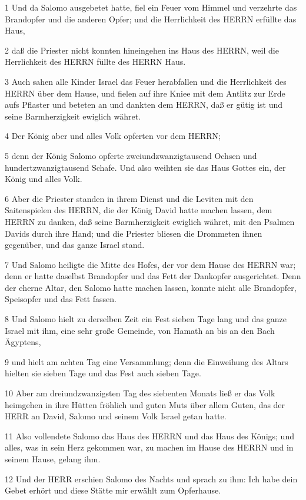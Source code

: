 \par 1 Und da Salomo ausgebetet hatte, fiel ein Feuer vom Himmel und verzehrte das Brandopfer und die anderen Opfer; und die Herrlichkeit des HERRN erfüllte das Haus,
\par 2 daß die Priester nicht konnten hineingehen ins Haus des HERRN, weil die Herrlichkeit des HERRN füllte des HERRN Haus.
\par 3 Auch sahen alle Kinder Israel das Feuer herabfallen und die Herrlichkeit des HERRN über dem Hause, und fielen auf ihre Kniee mit dem Antlitz zur Erde aufs Pflaster und beteten an und dankten dem HERRN, daß er gütig ist und seine Barmherzigkeit ewiglich währet.
\par 4 Der König aber und alles Volk opferten vor dem HERRN;
\par 5 denn der König Salomo opferte zweiundzwanzigtausend Ochsen und hundertzwanzigtausend Schafe. Und also weihten sie das Haus Gottes ein, der König und alles Volk.
\par 6 Aber die Priester standen in ihrem Dienst und die Leviten mit den Saitenspielen des HERRN, die der König David hatte machen lassen, dem HERRN zu danken, daß seine Barmherzigkeit ewiglich währet, mit den Psalmen Davids durch ihre Hand; und die Priester bliesen die Drommeten ihnen gegenüber, und das ganze Israel stand.
\par 7 Und Salomo heiligte die Mitte des Hofes, der vor dem Hause des HERRN war; denn er hatte daselbst Brandopfer und das Fett der Dankopfer ausgerichtet. Denn der eherne Altar, den Salomo hatte machen lassen, konnte nicht alle Brandopfer, Speisopfer und das Fett fassen.
\par 8 Und Salomo hielt zu derselben Zeit ein Fest sieben Tage lang und das ganze Israel mit ihm, eine sehr große Gemeinde, von Hamath an bis an den Bach Ägyptens,
\par 9 und hielt am achten Tag eine Versammlung; denn die Einweihung des Altars hielten sie sieben Tage und das Fest auch sieben Tage.
\par 10 Aber am dreiundzwanzigsten Tag des siebenten Monats ließ er das Volk heimgehen in ihre Hütten fröhlich und guten Muts über allem Guten, das der HERR an David, Salomo und seinem Volk Israel getan hatte.
\par 11 Also vollendete Salomo das Haus des HERRN und das Haus des Königs; und alles, was in sein Herz gekommen war, zu machen im Hause des HERRN und in seinem Hause, gelang ihm.
\par 12 Und der HERR erschien Salomo des Nachts und sprach zu ihm: Ich habe dein Gebet erhört und diese Stätte mir erwählt zum Opferhause.
